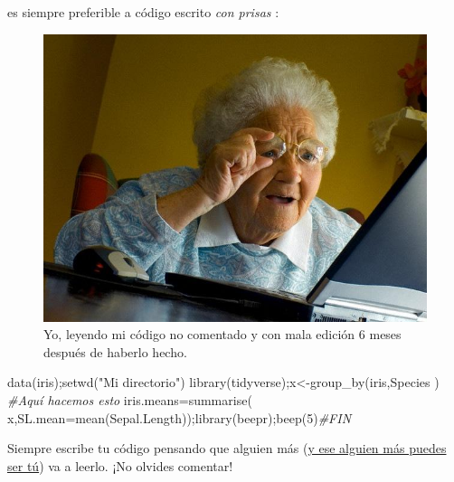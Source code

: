 \documentclass[
]{book}
\newenvironment{Shaded}{\begin{snugshade}}{\end{snugshade}}
\newcommand{\AttributeTok}[1]{\textcolor[rgb]{0.77,0.63,0.00}{#1}}
\newcommand{\CommentTok}[1]{\textcolor[rgb]{0.56,0.35,0.01}{\textit{#1}}}
\newcommand{\DecValTok}[1]{\textcolor[rgb]{0.00,0.00,0.81}{#1}}
\newcommand{\FunctionTok}[1]{\textcolor[rgb]{0.00,0.00,0.00}{#1}}
\newcommand{\NormalTok}[1]{#1}
\newcommand{\OtherTok}[1]{\textcolor[rgb]{0.56,0.35,0.01}{#1}}
\newcommand{\StringTok}[1]{\textcolor[rgb]{0.31,0.60,0.02}{#1}}
\begin{document}
es siempre preferible a código escrito \emph{con prisas} :

\begin{figure}

{\centering \includegraphics[width=8.89in]{images/Grandma-Finds-The-Internet} 

}

\caption{Yo, leyendo mi código no comentado y con mala edición 6 meses después de haberlo hecho.}\label{fig:unnamed-chunk-299}
\end{figure}

\begin{Shaded}
\begin{Highlighting}[]
\FunctionTok{data}\NormalTok{(iris);}\FunctionTok{setwd}\NormalTok{(}\StringTok{"Mi directorio"}\NormalTok{)}
\FunctionTok{library}\NormalTok{(tidyverse);x}\OtherTok{\textless{}{-}}\FunctionTok{group\_by}\NormalTok{(iris,Species  )}
\CommentTok{\#Aquí hacemos esto}
\NormalTok{iris.means}\OtherTok{=}\FunctionTok{summarise}\NormalTok{( x,}\AttributeTok{SL.mean=}\FunctionTok{mean}\NormalTok{(Sepal.Length));}\FunctionTok{library}\NormalTok{(beepr);}\FunctionTok{beep}\NormalTok{(}\DecValTok{5}\NormalTok{)}\CommentTok{\#FIN}
\end{Highlighting}
\end{Shaded}

Siempre escribe tu código pensando que alguien más (\href{https://www.redaccionmedica.com/virico/noticias/el-gato-de-schrodinger-y-por-que-no-abrir-la-puerta-cerrada-de-la-consulta-5188}{y ese alguien más puedes ser tú}) va a leerlo. ¡No olvides comentar!
\end{document}
